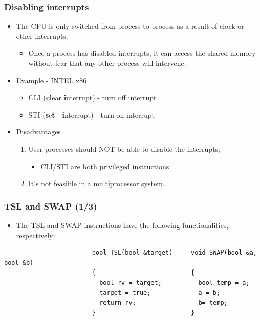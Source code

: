 \documentclass[CJKutf8,xcolor=pdftex,dvipsnames,table]{beamer}
\begin{document}
\begin{CJK*}{UTF8}{song}
  \begin{frame}
  \frametitle{Disabling interrupts} \pause
  \begin{itemize}
  \item{The CPU is only switched from process to process as a result of clock or other interrupts.} \pause
    \begin{itemize}
    \item{Once a process has disabled interrupts, it can access the shared memory without fear that any other process will intervene.} \pause
    \end{itemize}
  \item{Example - INTEL x86} \pause
    \begin{itemize}
	\item{CLI (\textbf{cl}ear \textbf{i}nterrupt) - turn off interrupt} \pause
	\item{STI (\textbf{s}e\textbf{t} - \textbf{i}nterrupt) - turn on interrupt} \pause
    \end{itemize}
  \item{Disadvantages} \pause
    \begin{enumerate}
    \item{User processes should NOT be able to disable the interrupts;} \pause
      \begin{itemize}
	  \item{CLI/STI are both privileged instructions} \pause
	  \end{itemize}
    \item{It's not feasible in a multiprocessor system.}
    \end{enumerate}
  \end{itemize}
  \end{frame}

  \begin{frame}[fragile]
  \frametitle{TSL and SWAP (1/3)} \pause
  \begin{itemize}
  \item{The TSL and SWAP instructions have the following functionalities, respectively:} \pause
  \end{itemize}

\begin{lstlisting}
						bool TSL(bool &target)     void SWAP(bool &a, bool &b)
						{                          {
						  bool rv = target;          bool temp = a;
						  target = true;             a = b;
						  return rv;                 b= temp;
						}                          }
\end{lstlisting}


\end{frame}
\end{CJK*}
\end{document}

